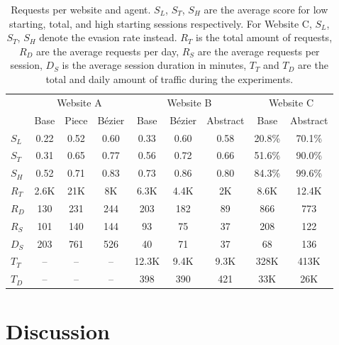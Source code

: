 \begin{table*}
\centering
   \begin{tabular}{lccc|ccc|cc}
    \toprule
    &
      \multicolumn{3}{c}{Website A} &
      \multicolumn{3}{c}{Website B} &
      \multicolumn{2}{c}{Website C}\\
      & \small {Base} & \small {Piece} & \small {Bézier} & \small {Base} & \small {Bézier} & \small {Abstract} & \small {Base} & \small {Abstract}\\
      \toprule
    $S_L$ & 0.22 & 0.52 & 0.60 & 0.33 & 0.60 & 0.58 & 20.8\% & 70.1\%\\
    $S_T$ & 0.31 & 0.65 & 0.77 & 0.56 & 0.72 & 0.66 & 51.6\% & 90.0\% \\
    $S_H$ & 0.52 & 0.71 & 0.83 & 0.73 & 0.86 & 0.80 & 84.3\% & 99.6\% \\
    \midrule
    $R_T$ & 2.6K & 21K & 8K & 6.3K & 4.4K & 2K & 8.6K & 12.4K\\
    $R_D$ & 130 & 231 & 244 & 203 & 182 & 89 & 866 & 773 \\
    $R_S$ & 101 & 140 & 144 & 93 & 75 & 37 & 208 & 122\\
    $D_S$ & 203 & 761 & 526 & 40 & 71 & 37 & 68 & 136\\
    \midrule
    $T_T$ & -- & -- & -- & 12.3K & 9.4K & 9.3K & 328K & 413K \\
    $T_D$ & -- & -- & -- & 398 & 390 & 421 & 33K & 26K\\
    \bottomrule
  \end{tabular}
  \caption[reCaptcha requests and scores per website and agent.]{Requests per website and agent. $S_L$, $S_T$, $S_H$ are the average score for low starting, total, and high starting sessions respectively. For Website C, $S_L$, $S_T$, $S_H$ denote the evasion rate instead. $R_T$ is the total amount of requests, $R_D$ are the average requests per day, $R_S$ are the average requests per session, $D_S$ is the average session duration in minutes, $T_T$ and $T_D$ are the total and daily amount of traffic during the experiments.}
  \label{tab:requests}
\end{table*}

\section{Discussion}
\label{sec:discussionre}

